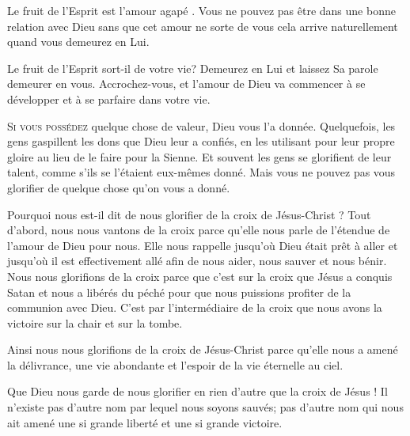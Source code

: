 Le fruit de l'Esprit est l'amour \Og agapé \Fg{}. Vous ne pouvez pas être
 dans une bonne relation avec Dieu sans que cet amour ne sorte de vous
 \ocadr cela arrive naturellement quand vous demeurez en Lui.

Le fruit de l'Esprit sort-il de votre vie? Demeurez en Lui et laissez Sa parole
 demeurer en vous. Accrochez-vous, et l'amour de Dieu va commencer
 à se développer et à se parfaire dans votre vie.

\dvrule






\lettrine{S}{i vous possédez} quelque chose de valeur,
 Dieu vous l'a donnée. Quelquefois, les gens gaspillent les dons que Dieu
 leur a confiés, en les utilisant pour leur propre gloire au lieu
 de le faire pour la Sienne. Et souvent les gens se glorifient
 de leur talent, comme s'ils se l'étaient eux-mêmes donné.
 Mais vous ne pouvez pas vous glorifier de quelque chose qu'on vous a donné. 


Pourquoi nous est-il dit de nous glorifier de la croix de Jésus-Christ ?
 Tout d'abord, nous nous vantons de la croix parce qu'elle nous parle
 de l'étendue de l'amour de Dieu pour nous. Elle nous rappelle jusqu'où Dieu
 était prêt à aller \ocadr et jusqu'où il est effectivement allé \fcadr{}
 afin de nous aider, nous sauver et nous bénir.
 Nous nous glorifions de la croix parce que c'est sur la croix que Jésus
 a conquis Satan et nous a libérés du péché pour que nous puissions
 profiter de la communion avec Dieu. C'est par l'intermédiaire de la croix
 que nous avons la victoire sur la chair et sur la tombe.

Ainsi nous nous glorifions de la croix de Jésus-Christ
 parce qu'elle nous a amené la délivrance, une vie abondante et l'espoir
 de la vie éternelle au ciel.

Que Dieu nous garde de nous glorifier en rien d'autre que la croix de Jésus !
 Il n'existe pas d'autre nom par lequel nous soyons sauvés;
 pas d'autre nom qui nous ait amené une si grande liberté
 et une si grande victoire.

